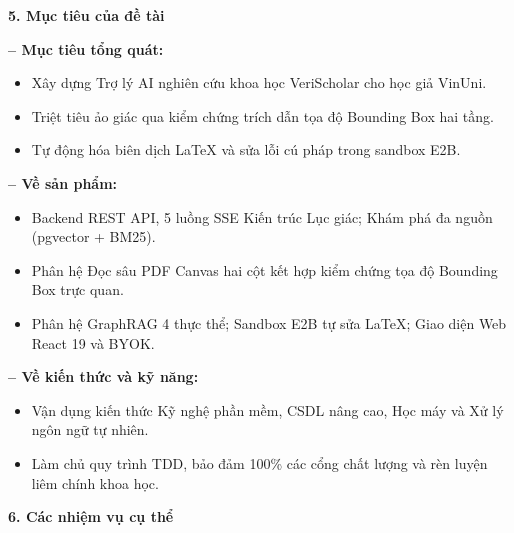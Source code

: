 \newpage
\thispagestyle{adminform}

\noindent \textbf{5. Mục tiêu của đề tài}
\vspace{0.02cm}

\noindent \textbf{-- Mục tiêu tổng quát:}
\begin{itemize}[leftmargin=*, noitemsep, topsep=1pt, parsep=0pt, partopsep=0pt]
    \item Xây dựng Trợ lý AI nghiên cứu khoa học VeriScholar cho học giả VinUni.
    \item Triệt tiêu ảo giác qua kiểm chứng trích dẫn tọa độ Bounding Box hai tầng.
    \item Tự động hóa biên dịch LaTeX và sửa lỗi cú pháp trong sandbox E2B.
\end{itemize}

\vspace{0.03cm}
\noindent \textbf{-- Về sản phẩm:}
\begin{itemize}[leftmargin=*, noitemsep, topsep=1pt, parsep=0pt, partopsep=0pt]
    \item Backend REST API, 5 luồng SSE Kiến trúc Lục giác; Khám phá đa nguồn (pgvector + BM25).
    \item Phân hệ Đọc sâu PDF Canvas hai cột kết hợp kiểm chứng tọa độ Bounding Box trực quan.
    \item Phân hệ GraphRAG 4 thực thể; Sandbox E2B tự sửa LaTeX; Giao diện Web React 19 và BYOK.
\end{itemize}

\vspace{0.03cm}
\noindent \textbf{-- Về kiến thức và kỹ năng:}
\begin{itemize}[leftmargin=*, noitemsep, topsep=1pt, parsep=0pt, partopsep=0pt]
    \item Vận dụng kiến thức Kỹ nghệ phần mềm, CSDL nâng cao, Học máy và Xử lý ngôn ngữ tự nhiên.
    \item Làm chủ quy trình TDD, bảo đảm 100\% các cổng chất lượng và rèn luyện liêm chính khoa học.
\end{itemize}

\vspace{0.05cm}
\noindent \textbf{6. Các nhiệm vụ cụ thể}
\vspace{0.02cm}

